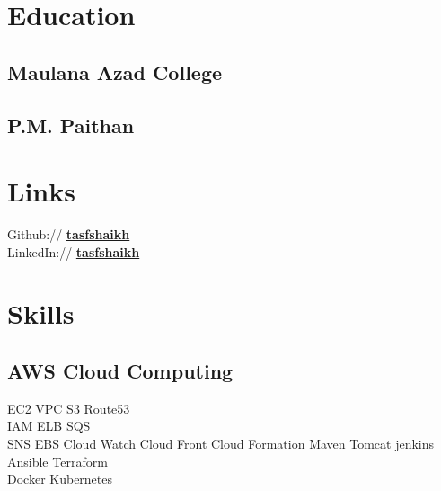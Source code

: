 \documentclass[]{deedy-resume-openfont}
\begin{document}
%
%
\lastupdated

%
%

%
%

\begin{minipage}[t]{0.33\textwidth} 


\section{Education} 

\subsection{Maulana Azad College}
\sectionsep

\subsection{P.M. Paithan}
\sectionsep



\section{Links} 
Github:// \href{https://github.com/tasfshaikh}{\bf tasfshaikh} \\
LinkedIn://  \href{https://www.linkedin.com/in/tasfshaikh}{\bf tasfshaikh}
\sectionsep


\section{Skills}
\subsection{AWS Cloud Computing}
EC2 \textbullet{}   VPC \textbullet{} S3 \textbullet{} Route53 \\
IAM \textbullet{} ELB \textbullet{} SQS \\ SNS \textbullet{} EBS \textbullet{} Cloud Watch \textbullet{} Cloud Front \textbullet{} Cloud Formation \textbullet{} Maven \textbullet{} Tomcat \textbullet{} jenkins \textbullet{} Ansible \textbullet{} Terraform\\ 
\sectionsep
{}
Docker \textbullet{} Kubernetes
\sectionsep


\end{minipage}
\end{document}
